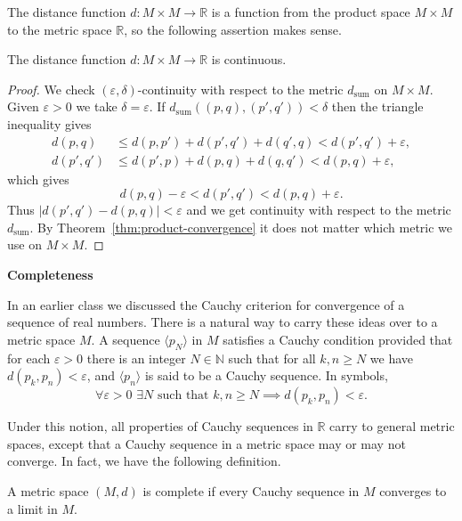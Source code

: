 The distance function $d: M \times M \to \mathbb{R}$ is a function from the product space $M \times M$ to the metric space $\mathbb{R}$, so the following assertion makes sense.

\begin{thm}
  The distance function $d: M \times M \to \mathbb{R}$ is continuous.
\end{thm}

\begin{proof}
  We check $(\varepsilon, \delta)$-continuity with respect to the metric $d_{\operatorname{sum}}$ on $M \times M$.
  Given $\varepsilon > 0$ we take $\delta = \varepsilon$.
  If $d_{\operatorname{sum}}( (p,q), (p',q') ) < \delta$ then the triangle inequality gives
  \begin{align*}
    d(p,q)   &\leqslant d(p,p') + d(p',q') + d(q',q) < d(p',q') + \varepsilon, \\
    d(p',q') &\leqslant d(p',p) + d(p,q) + d(q,q') < d(p,q) + \varepsilon,
  \end{align*}
  which gives
  \[
    d(p,q) - \varepsilon < d(p',q') < d(p,q) + \varepsilon.
  \]
  Thus $|d(p',q') - d(p,q)| < \varepsilon$ and we get continuity with respect to the metric $d_{\operatorname{sum}}$.
  By Theorem~\ref{thm:product-convergence} it does not matter which metric we use on $M \times M$.
\end{proof}

\medskip
\noindent\textbf{\large Completeness}

In an earlier class we discussed the Cauchy criterion for convergence of a sequence of real numbers.
There is a natural way to carry these ideas over to a metric space $M$.
A sequence $\langle p_N \rangle$ in $M$ satisfies a \textsf{Cauchy condition} provided that for each $\varepsilon > 0$ there is an integer $N \in \mathbb{N}$ such that for all $k, n \geqslant N$ we have $d(p_k, p_n) < \varepsilon$, and $\langle p_n \rangle$ is said to be a \textsf{Cauchy sequence}.  In symbols,
\[
  \forall \varepsilon > 0 \,\, \exists N \text{ such that } k, n \geqslant N \implies d(p_k, p_n) < \varepsilon.
\]

Under this notion, all properties of Cauchy sequences in $\mathbb{R}$ carry to general metric spaces, except that a Cauchy sequence in a metric space may or may not converge.
In fact, we have the following definition.

\begin{defn}
  A metric space $(M,d)$ is \textsf{complete} if every Cauchy sequence in $M$ converges to a limit in $M$.
\end{defn}

